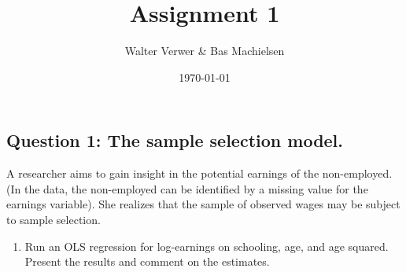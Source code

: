 \documentclass[
]{article}
\title{Assignment 1}
\author{Walter Verwer \& Bas Machielsen}
\date{\today}
\newenvironment{Shaded}{\begin{snugshade}}{\end{snugshade}}
\newcommand{\DataTypeTok}[1]{\textcolor[rgb]{0.13,0.29,0.53}{#1}}
\newcommand{\DecValTok}[1]{\textcolor[rgb]{0.00,0.00,0.81}{#1}}
\newcommand{\KeywordTok}[1]{\textcolor[rgb]{0.13,0.29,0.53}{\textbf{#1}}}
\newcommand{\NormalTok}[1]{#1}
\newcommand{\OperatorTok}[1]{\textcolor[rgb]{0.81,0.36,0.00}{\textbf{#1}}}
\newcommand{\StringTok}[1]{\textcolor[rgb]{0.31,0.60,0.02}{#1}}
\providecommand{\tightlist}{%
  \setlength{\itemsep}{0pt}\setlength{\parskip}{0pt}}
\begin{document}
\maketitle

\hypertarget{question-1-the-sample-selection-model.}{%
\subsection{Question 1: The sample selection
model.}\label{question-1-the-sample-selection-model.}}

A researcher aims to gain insight in the potential earnings of the
non-employed. (In the data, the non-employed can be identified by a
missing value for the earnings variable). She realizes that the sample
of observed wages may be subject to sample selection.

\begin{enumerate}
\def\labelenumi{(\alph{enumi})}
\tightlist
\item
  Run an OLS regression for log-earnings on schooling, age, and age
  squared. Present the results and comment on the estimates.
\end{enumerate}

\begin{Shaded}
\end{Shaded}
\end{document}
